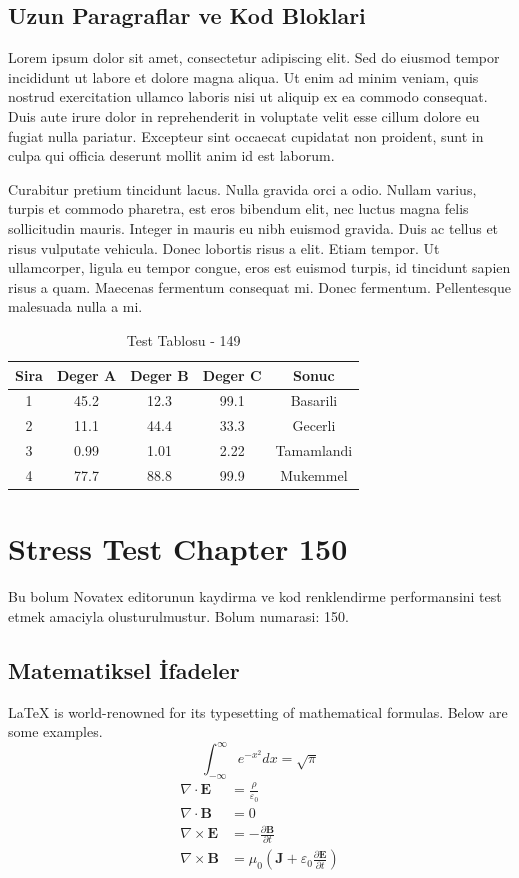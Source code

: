 \documentclass[12pt,a4paper]{article}
\begin{document}
\subsection{Uzun Paragraflar ve Kod Bloklari}
Lorem ipsum dolor sit amet, consectetur adipiscing elit. Sed do eiusmod tempor incididunt ut labore et dolore magna aliqua. Ut enim ad minim veniam, quis nostrud exercitation ullamco laboris nisi ut aliquip ex ea commodo consequat. Duis aute irure dolor in reprehenderit in voluptate velit esse cillum dolore eu fugiat nulla pariatur. Excepteur sint occaecat cupidatat non proident, sunt in culpa qui officia deserunt mollit anim id est laborum.

Curabitur pretium tincidunt lacus. Nulla gravida orci a odio. Nullam varius, turpis et commodo pharetra, est eros bibendum elit, nec luctus magna felis sollicitudin mauris. Integer in mauris eu nibh euismod gravida. Duis ac tellus et risus vulputate vehicula. Donec lobortis risus a elit. Etiam tempor. Ut ullamcorper, ligula eu tempor congue, eros est euismod turpis, id tincidunt sapien risus a quam. Maecenas fermentum consequat mi. Donec fermentum. Pellentesque malesuada nulla a mi.

\begin{table}[h!]
\centering
\begin{tabular}{|c|c|c|c|c|}
\hline
\textbf{Sira} & \textbf{Deger A} & \textbf{Deger B} & \textbf{Deger C} & \textbf{Sonuc} \\
\hline
1 & 45.2 & 12.3 & 99.1 & Basarili \\
2 & 11.1 & 44.4 & 33.3 & Gecerli \\
3 & 0.99 & 1.01 & 2.22 & Tamamlandi \\
4 & 77.7 & 88.8 & 99.9 & Mukemmel \\
\hline
\end{tabular}
\caption{Test Tablosu - 149}
\end{table}

\newpage
\section{Stress Test Chapter 150}
Bu bolum Novatex editorunun kaydirma ve kod renklendirme performansini test etmek amaciyla olusturulmustur. Bolum numarasi: 150.

\subsection{Matematiksel İfadeler}
\LaTeX{} is world-renowned for its typesetting of mathematical formulas. Below are some examples.
\begin{equation}
\int_{-\infty}^{\infty} e^{-x^2} dx = \sqrt{\pi}
\end{equation}
\begin{align}
\nabla \cdot \mathbf{E} &= \frac{\rho}{\varepsilon_0} \\
\nabla \cdot \mathbf{B} &= 0 \\
\nabla \times \mathbf{E} &= -\frac{\partial \mathbf{B}}{\partial t} \\
\nabla \times \mathbf{B} &= \mu_0\left(\mathbf{J} + \varepsilon_0 \frac{\partial \mathbf{E}}{\partial t}\right)
\end{align}
\end{document}
